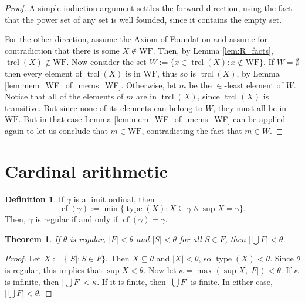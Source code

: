 \documentclass{report}
\newtheorem{theorem}{Theorem}[section]
\theoremstyle{definition}
\newtheorem{definition}{Definition}[section]
\theoremstyle{remark}
\newcommand{\set}[1]{\{#1\}}
\newcommand{\WF}{\mathrm{WF}}
\let\oldmax\max
\let\oldmin\min
\renewcommand{\max}[1]{\oldmax \left( #1 \right)}
\renewcommand{\min}[1]{\oldmin \left( #1 \right)}
\DeclareMathOperator{\type}{type}
\DeclareMathOperator{\cf}{cf}
\DeclareMathOperator{\trcl}{trcl}
\begin{document}
    \begin{proof}
        A simple induction argument settles the forward direction, using the fact that the power set of any set is well founded, since it contains the empty set.
        
        For the other direction, assume the Axiom of Foundation and assume for contradiction that there is some $X \notin \WF$. Then, by Lemma \ref{lem:R_facts}, $\trcl(X) \notin \WF$. Now consider the set $W := \set{x \in \trcl(X) : x \notin \WF}$. If $W = \emptyset$ then every element of $\trcl(X)$ is in $\WF$, thus so is $\trcl(X)$, by Lemma \ref{lem:mem_WF_of_mems_WF}. Otherwise, let $m$ be the $\in$-least element of $W$. Notice that all of the elements of $m$ are in $\trcl(X)$, since $\trcl(X)$ is transitive. But since none of its elements can belong to $W$, they must all be in $\WF$. But in that case Lemma \ref{lem:mem_WF_of_mems_WF} can be applied again to let us conclude that $m \in \WF$, contradicting the fact that $m \in W$.
    \end{proof}
    
    

\setcounter{section}{12}
\section{Cardinal arithmetic}

\begin{definition}
    If $\gamma$ is a limit ordinal, then 
    \begin{equation*}
        \cf(\gamma) := \oldmin\set{\type(X) : X \subseteq \gamma \land \sup X = \gamma}.
    \end{equation*} Then, $\gamma$ is regular if and only if $\cf(\gamma) = \gamma$.
\end{definition}

\begin{theorem} \label{theorem:union_of_lt_regular}
    If $\theta$ is regular, $|F| < \theta$ and $|S| < \theta$ for all $S \in F$, then $|\bigcup F| < \theta$.
\end{theorem}

\begin{proof}
    Let $X := \set{|S| : S \in F}$. Then $X \subseteq \theta$ and $|X| < \theta$, so $\type(X) < \theta$. Since $\theta$ is regular, this implies that $\sup X < \theta$. Now let $\kappa = \max{\sup X, |F|} < \theta$. If $\kappa$ is infinite, then  $|\bigcup F| < \kappa$. If it is finite, then $|\bigcup F|$ is finite. In either case, $|\bigcup F| < \theta$. 
\end{proof}
\end{document}
